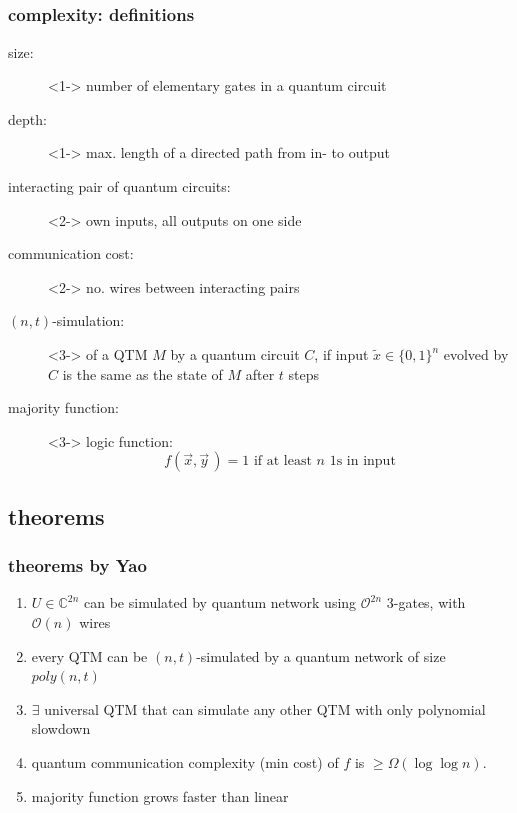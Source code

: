 \documentclass{beamer}
\begin{document}
\subsection[definitions]{}
\begin{frame}
    \frametitle{complexity: definitions}
    \begin{description}
        \item[size:]<1-> number of elementary gates in a quantum circuit
        \item[depth:]<1-> max. length of a directed path from in- to
        output
        \item[interacting pair of quantum circuits:]<2-> own inputs, all outputs on one side
        \item[communication cost:]<2-> no. wires between interacting pairs
        \item[$(n,t)$-simulation:]<3-> of a QTM $M$ by a quantum circuit $C$, if
        input $\tilde{x}\in\{0,1\}^n$ evolved by $C$ is the same as
        the state of $M$ after $t$ steps
        \item[majority function:]<3-> logic function:
		\begin{equation}
			f(\vec{x},\vec{y}\,)=1 \textrm{ if at least }n\textrm{ 1s in input}
		\end{equation}
    \end{description}
\end{frame}
%
\subsection{theorems}
\begin{frame}
	\frametitle{theorems by Yao}
    \begin{enumerate}
        \item $U\in\mathbb{C}^{2n}$ can be simulated by quantum network using $\mathcal{O}^{2n}$ 3-gates, with $\mathcal{O}(n)$ wires
        \item every QTM can be $(n,t)$-simulated by a quantum network of size $poly(n,t)$
        \item $\exists$ universal QTM that can simulate any other QTM with only polynomial slowdown
        \item quantum communication complexity (min cost) of $f$ is $\geq\Omega(\log\log n)$.
        \item majority function grows faster than linear
    \end{enumerate}
\end{frame}
%
\end{document}
